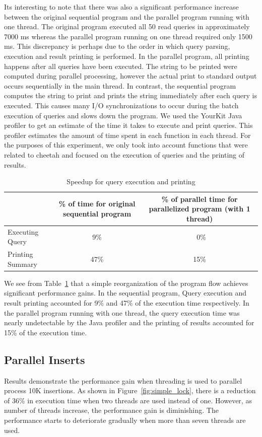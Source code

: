 \documentclass[11pt,journal,compsoc]{IEEEtran}
\begin{document}
It\textquotesingle s interesting to note that there was also a significant performance increase between the original sequential program and the parallel program running with one thread. The original program executed all 50 read queries in approximately 7000 ms whereas the parallel program running on one thread required only 1500 ms. This discrepancy is perhaps due to the order in which query parsing, execution and result printing is performed. In the parallel program, all printing happens after all queries have been executed. The string to be printed were computed during parallel processing, however the actual print to standard output occurs sequentially in the main thread. In contrast, the sequential program computes the string to print and prints the string immediately after each query is executed. This causes many I/O synchronizations to occur during the batch execution of queries and slows down the program. We used the YourKit Java profiler to get an estimate of the time it takes to execute and print queries. This profiler estimates the amount of time spent in each function in each thread. For the purposes of this experiment, we only took into account functions that were related to cheetah and focused on the execution of queries and the printing of results.

\begin{table}
  \centering
  \begin{tabular}{ |l || c | c |}
    \hline
     & \% of time for original sequential program & \% of parallel time for parallelized program (with 1 thread) \\ \hline\hline
    Executing Query & 9\% & ~0\% \\ \hline
    Printing Summary & 47\% & 15\% \\
    \hline

  \end{tabular}
\caption{Speedup for query execution and printing}
\label{table:speedup}
\end{table}


We see from Table~\ref{table:speedup} that a simple reorganization of the program flow achieves significant performance gains. In the sequential program, Query execution and result printing accounted for 9\% and 47\% of the execution time respectively. In the parallel program running with one thread, the query execution time was nearly undetectable by the Java profiler and the printing of results accounted for 15\% of the execution time. 


\subsection{Parallel Inserts}
Results demonstrate the performance gain when threading is used to parallel process 10K insertions. As shown in Figure~\ref{fig:simple_lock}, there is a reduction of 36\% in execution time when two threads are used instead of one. However, as number of threads increase, the performance gain is diminishing. The performance starts to deteriorate gradually when more than seven threads are used.
\end{document}
